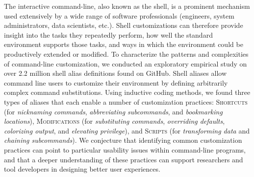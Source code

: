 The interactive command-line, also known as the shell, is a prominent mechanism used extensively by a wide range of software professionals (engineers, system administrators, data scientists, etc.). Shell customizations can therefore provide insight into the tasks they repeatedly perform, how well the standard environment supports those tasks, and ways in which the environment could be productively extended or modified.
To characterize the patterns and complexities of command-line customization, we conducted an exploratory empirical study on over 2.2 million shell alias definitions found on GitHub.
Shell aliases allow command line users to customize their environment by defining arbitrarily complex command substitutions.
Using inductive coding methods, we found three types of aliases that each enable a number of customization practices: 
\textsc{Shortcuts} (for \emph{nicknaming commands}, \emph{abbreviating subcommands}, and \emph{bookmarking locations}),
\textsc{Modifications} (for \emph{substituting commands}, \emph{overriding defaults}, \emph{colorizing output}, and \emph{elevating privilege}),
and \textsc{Scripts} (for \emph{transforming data} and \emph{chaining subcommands}).
We conjecture that identifying common customization practices can point to particular usability issues within command-line programs, and that a deeper understanding of these practices can support researchers and tool developers in designing better user experiences.